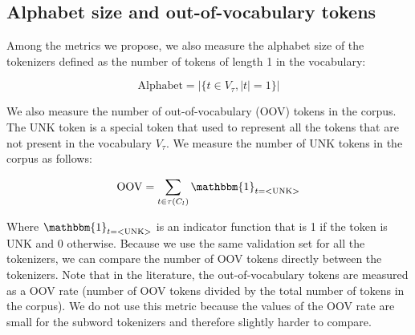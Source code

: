 \subsection{Alphabet size and out-of-vocabulary tokens}

Among the metrics we propose, we also measure the alphabet size of the tokenizers defined as the number of tokens of length 1 in the vocabulary:

\begin{equation}
    \mathrm{Alphabet} = |\{t \in V_\tau, |t| = 1\}|
\end{equation}

We also measure the number of out-of-vocabulary (OOV) tokens in the corpus. The UNK token is a special token that used to represent all the tokens that are not present in the vocabulary $V_\tau$. We measure the number of UNK tokens in the corpus as follows:

\begin{equation}
    \mathrm{OOV} = \sum_{t \in \tau(C_l)} \mathbbm{1}_{t = \mathrm{<UNK>}}
\end{equation}

Where $\mathbbm{1}_{t = \mathrm{<UNK>}}$ is an indicator function that is 1 if the token is UNK and 0 otherwise. Because we use the same validation set for all the tokenizers, we can compare the number of OOV tokens directly between the tokenizers. Note that in the literature, the out-of-vocabulary tokens are measured as a OOV rate (number of OOV tokens divided by the total number of tokens in the corpus). We do not use this metric because the values of the OOV rate are small for the subword tokenizers and therefore slightly harder to compare.





